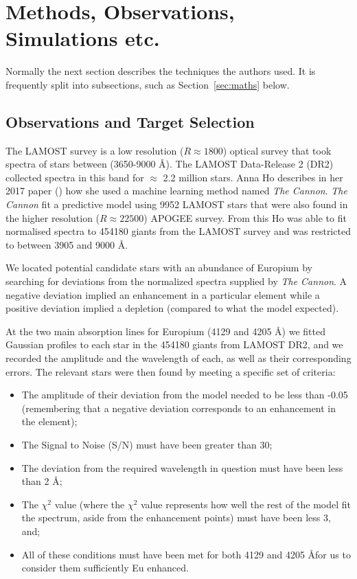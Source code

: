 \documentclass[a4paper,fleqn,usenatbib]{mnras}
\begin{document}
\section{Methods, Observations, Simulations etc.}
Normally the next section describes the techniques the authors used.
It is frequently split into subsections, such as Section~\ref{sec:maths} below.

\subsection{Observations and Target Selection}
The LAMOST survey is a low resolution ($R\approx1800$) optical survey that took spectra of stars between (3650-9000 \AA). The LAMOST Data-Release 2 (DR2) collected spectra in this band for $\approx$ 2.2 million stars. Anna Ho describes in her 2017 paper (\cite{AnnaHo2017}) how she used a machine learning method named \textit{The Cannon}. \textit{The Cannon} fit a predictive model using 9952 LAMOST stars that were also found in the higher resolution ($R\approx22500$) APOGEE survey. From this Ho was able to fit normalised spectra to 454180 giants from the LAMOST survey and was restricted to between 3905 and 9000 \AA.

We located potential candidate stars with an abundance of Europium by searching for deviations from the normalized spectra supplied by \textit{The Cannon}. A negative deviation implied an enhancement in a particular element while a positive deviation implied a depletion (compared to what the model expected). 

At the two main absorption lines for Europium (4129 and 4205 \AA) we fitted Gaussian profiles to each star in the 454180 giants from LAMOST DR2, and we recorded the amplitude and the wavelength of each, as well as their corresponding errors. The relevant stars were then found by meeting a specific set of criteria: 

\begin{itemize}
	\item The amplitude of their deviation from the model needed to be less than -0.05 (remembering that a negative deviation corresponds to an enhancement in the element);
	\item The Signal to Noise (S/N) must have been greater than 30;
	\item The deviation from the required wavelength in question must have been less than 2 \AA;
	\item The $\chi^{2}$ value (where the $\chi^{2}$ value represents how well the rest of the model fit the spectrum, aside from the enhancement points) must have been less 3, and;
	\item All of these conditions must have been met for both 4129 and 4205 \AA for us to consider them sufficiently Eu enhanced.
\end{itemize}   
\end{document}
